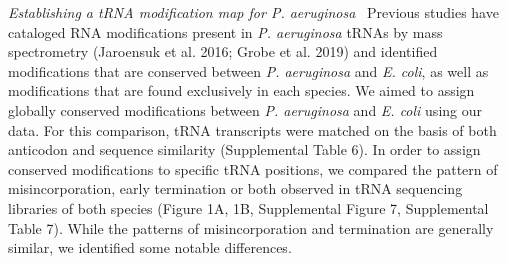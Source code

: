 \documentclass[times, twoside]{zHenriquesLab-StyleBioRxiv}
\begin{document}
 
 \newline
\textit{Establishing a tRNA modification map for P. aeruginosa} \newline
\ Previous studies have cataloged RNA modifications present in \textit{P. aeruginosa} tRNAs by mass spectrometry (Jaroensuk et al. 2016; Grobe et al. 2019) and identified modifications that are conserved between \textit{P. aeruginosa} and \textit{E. coli}, as well as modifications that are found exclusively in each species. We aimed to assign globally conserved modifications between \textit{P. aeruginosa} and \textit{E. coli} using our data. For this comparison, tRNA transcripts were matched on the basis of both anticodon and sequence similarity (Supplemental Table 6). In order to assign conserved modifications to specific tRNA positions, we compared the pattern of misincorporation, early termination or both observed in tRNA sequencing libraries of both species (Figure 1A, 1B, Supplemental Figure 7, Supplemental Table 7). While the patterns of misincorporation and termination are generally similar, we  identified some notable differences.  
\newline
\newline
\end{document}
